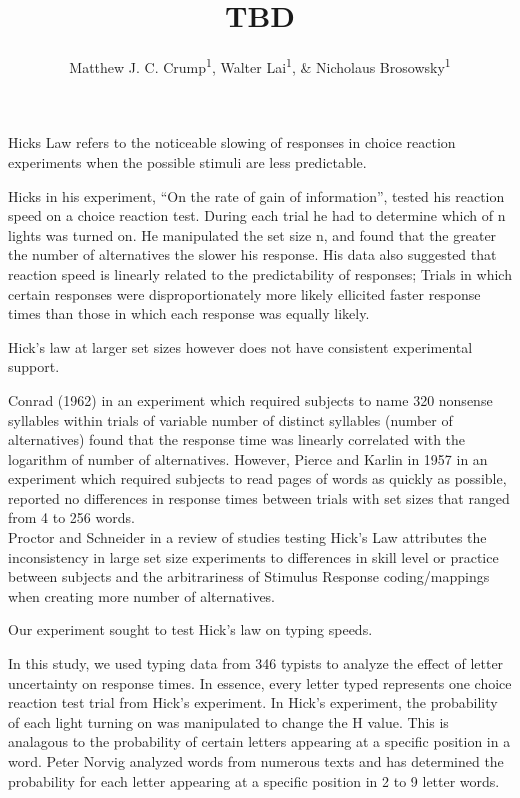 \documentclass[man]{apa6}
\title{TBD}
\author{Matthew J. C. Crump\textsuperscript{1}, Walter Lai\textsuperscript{1}, \& Nicholaus Brosowsky\textsuperscript{1}}
\affiliation{
    \vspace{0.5cm}
          \textsuperscript{1} Brooklyn College of the City University of New York  }
\theoremstyle{definition}
\theoremstyle{definition}
\theoremstyle{definition}
\theoremstyle{remark}
\begin{document}
\maketitle

\setcounter{secnumdepth}{0}



Hicks Law refers to the noticeable slowing of responses in choice
reaction experiments when the possible stimuli are less predictable.

Hicks in his experiment, \enquote{On the rate of gain of information},
tested his reaction speed on a choice reaction test. During each trial
he had to determine which of n lights was turned on. He manipulated the
set size n, and found that the greater the number of alternatives the
slower his response. His data also suggested that reaction speed is
linearly related to the predictability of responses; Trials in which
certain responses were disproportionately more likely ellicited faster
response times than those in which each response was equally likely.

Hick's law at larger set sizes however does not have consistent
experimental support.

Conrad (1962) in an experiment which required subjects to name 320
nonsense syllables within trials of variable number of distinct
syllables (number of alternatives) found that the response time was
linearly correlated with the logarithm of number of alternatives.
However, Pierce and Karlin in 1957 in an experiment which required
subjects to read pages of words as quickly as possible, reported no
differences in response times between trials with set sizes that ranged
from 4 to 256 words.\\
Proctor and Schneider in a review of studies testing Hick's Law
attributes the inconsistency in large set size experiments to
differences in skill level or practice between subjects and the
arbitrariness of Stimulus Response coding/mappings when creating more
number of alternatives.

Our experiment sought to test Hick's law on typing speeds.

In this study, we used typing data from 346 typists to analyze the
effect of letter uncertainty on response times. In essence, every letter
typed represents one choice reaction test trial from Hick's experiment.
In Hick's experiment, the probability of each light turning on was
manipulated to change the H value. This is analagous to the probability
of certain letters appearing at a specific position in a word. Peter
Norvig analyzed words from numerous texts and has determined the
probability for each letter appearing at a specific position in 2 to 9
letter words.
\end{document}
